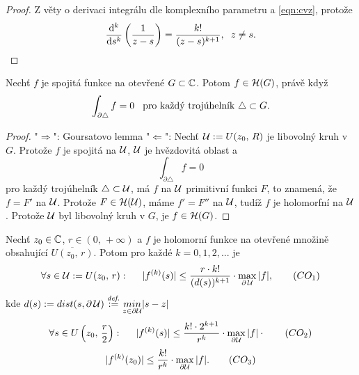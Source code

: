 \begin{proof}
Z věty o derivaci integrálu dle komplexního parametru a \cref{eqn:cvz}, protože 
\[\frac{\mathop{}\!\mathrm{d}^k}{\mathop{}\!\mathrm{d} s^k}\left(\frac{1}{z-s}\right)=
\frac{k!}{(z-s)^{k+1}},\hspace{2mm} z\neq{s}.\]
\end{proof}


\begin{theorem}[Morera]\label{thm:morera}
Nechť $f$ je spojitá funkce na otevřené $G\subset{\operatorname{\mathbb{C}}}$. Potom $f\in\operatorname{\mathcal{H}} (G)$, právě když
\begin{equation}
    \begin{aligned}
\int_{\partial\triangle}{f} =0 \hspace{3mm} \text{pro každý trojúhelník }\triangle\subset{G}.    
    \end{aligned}
    \label{eqn:morera}
\end{equation}
\end{theorem}

\begin{proof}
"$\Rightarrow$": Goursatovo lemma\newline
"$\Leftarrow$": Nechť $\operatorname{\mathcal{U}} :=U(z_0,\, R)$ je libovolný kruh v $G$. Protože $f$ je spojitá na $\operatorname{\mathcal{U}} $, $\operatorname{\mathcal{U}} $ je hvězdovitá oblast a 
\[\int_{\partial\triangle}{f} =0\]
pro každý trojúhelník $\triangle\subset\operatorname{\mathcal{U}} $, má $f$ na $\operatorname{\mathcal{U}} $ primitivní funkci $F$, to znamená, že $f=F'$ na $\operatorname{\mathcal{U}} $. Protože $F\in\operatorname{\mathcal{H}} (\operatorname{\mathcal{U}} )$, máme $f'=F''$ na $\operatorname{\mathcal{U}} $, tudíž $f$ je holomorfní na $\operatorname{\mathcal{U}} $. Protože $\operatorname{\mathcal{U}} $ byl libovolný kruh v $G$, je $f\in\operatorname{\mathcal{H}} (G)$.
\end{proof}


\begin{theorem}
Nechť $z_0\in\operatorname{\mathbb{C}}  $, $r\in(0,\, +\infty)$ a $f$ je holomorní funkce na otevřené množině obsahující $\overline{U(z_0,\, r)}$. Potom pro každé $k=0,1,2,...$ je 
\begin{equation}
\forall{s\in{\operatorname{\mathcal{U}}:=U(z_0,\,r)}}:\hspace{5mm}|f^{(k)}(s)|\leq\frac{r\cdot k!}{(d(s))^{k+1}}\cdot \max_{\partial\operatorname{\mathcal{U}} }{|f|},    
\tag{$CO_1$}
\label{eqn:co1}
\end{equation}
kde $d(s) := dist(s,\partial\operatorname{\mathcal{U}} )\overset{\textit{def.}}{:=}\underset{{z\in{\partial{\operatorname{\mathcal{U}}}}}}{min}{|s-z|}$
\begin{equation}
\forall{s\in{U\left(z_0,\,\frac{r}{2}\right)}}:\hspace{5mm}|f^{(k)}(s)|\leq\frac{k!\cdot2^{k+1}}{r^k}\cdot\max_{\partial{\operatorname{\mathcal{U}}}}{|f|}\cdot
\tag{$CO_2$}
\label{eqn:co2}
\end{equation}
\begin{equation}
    |f^{(k)}(z_0)|\leq\frac{k!}{r^k}\cdot\max_{\partial{\operatorname{\mathcal{U}}}}{|f|}. 
\tag{$CO_3$}
\label{eqn:co3}
\end{equation}
\end{theorem}

